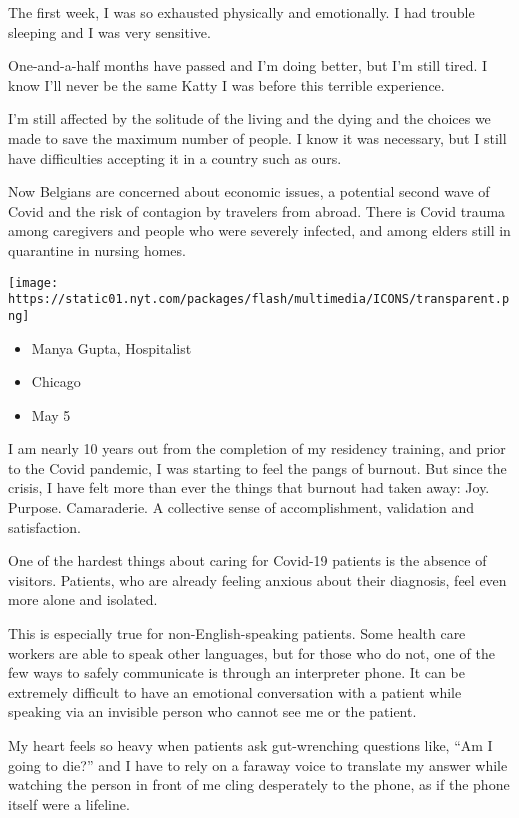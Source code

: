 The first week, I was so exhausted physically and emotionally. I had
trouble sleeping and I was very sensitive.

One-and-a-half months have passed and I'm doing better, but I'm still
tired. I know I'll never be the same Katty I was before this terrible
experience.

I'm still affected by the solitude of the living and the dying and the
choices we made to save the maximum number of people. I know it was
necessary, but I still have difficulties accepting it in a country such
as ours.

Now Belgians are concerned about economic issues, a potential second
wave of Covid and the risk of contagion by travelers from abroad. There
is Covid trauma among caregivers and people who were severely infected,
and among elders still in quarantine in nursing homes.

\texttt{[image: https://static01.nyt.com/packages/flash/multimedia/ICONS/transparent.png]}

\begin{itemize}
\tightlist
\item
  Manya Gupta, Hospitalist
\item
  Chicago
\item
  May 5
\end{itemize}

I am nearly 10 years out from the completion of my residency training,
and prior to the Covid pandemic, I was starting to feel the pangs of
burnout. But since the crisis, I have felt more than ever the things
that burnout had taken away: Joy. Purpose. Camaraderie. A collective
sense of accomplishment, validation and satisfaction.

One of the hardest things about caring for Covid-19 patients is the
absence of visitors. Patients, who are already feeling anxious about
their diagnosis, feel even more alone and isolated.

This is especially true for non-English-speaking patients. Some health
care workers are able to speak other languages, but for those who do
not, one of the few ways to safely communicate is through an interpreter
phone. It can be extremely difficult to have an emotional conversation
with a patient while speaking via an invisible person who cannot see me
or the patient.

My heart feels so heavy when patients ask gut-wrenching questions like,
``Am I going to die?'' and I have to rely on a faraway voice to
translate my answer while watching the person in front of me cling
desperately to the phone, as if the phone itself were a lifeline.

